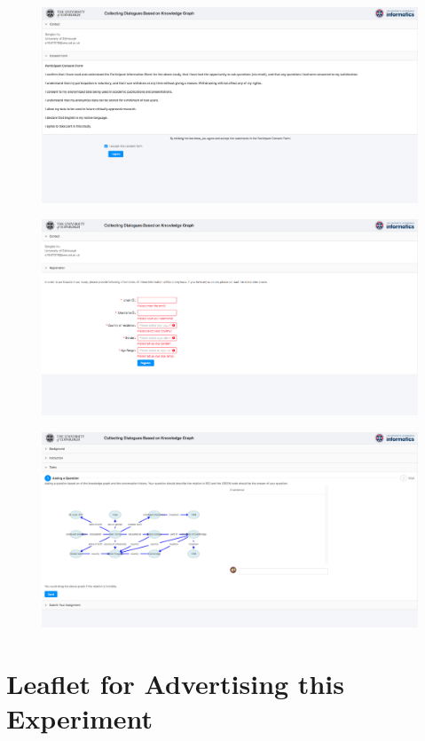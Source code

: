 \documentclass[bsc,frontabs,twoside,singlespacing,parskip,deptreport]{infthesis}     %
\begin{document}
\begin{figure}[h]
    \includegraphics[width=\textwidth]{conssent.png}
    \label{fig:cons}
\end{figure}




\begin{figure}[h]
    \includegraphics[width=\textwidth]{info.png}
    \label{fig:info}
\end{figure}

\begin{figure}[h]
    \includegraphics[width=\textwidth]{work.png}
    \label{fig:work}
\end{figure}

\chapter{Leaflet for Advertising this Experiment}
\label{appendix:leaflet}


\label{}
\end{document}
